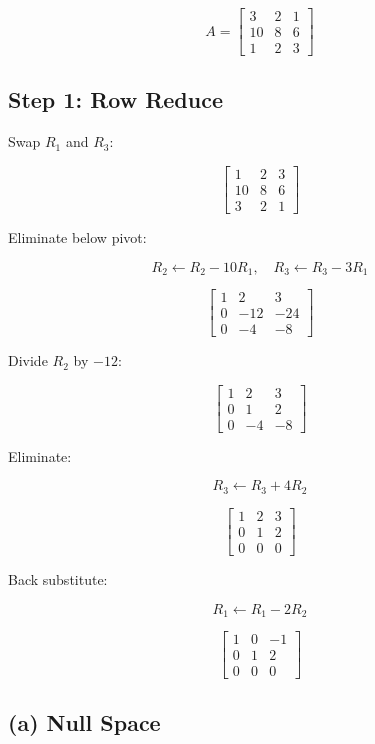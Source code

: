 \documentclass[11pt]{article}
\begin{document}
\[
A =
\begin{bmatrix}
3 & 2 & 1 \\
10 & 8 & 6 \\
1 & 2 & 3
\end{bmatrix}
\]

\subsection*{Step 1: Row Reduce}

Swap $R_1$ and $R_3$:

\[
\begin{bmatrix}
1 & 2 & 3 \\
10 & 8 & 6 \\
3 & 2 & 1
\end{bmatrix}
\]

Eliminate below pivot:

\[
R_2 \leftarrow R_2 - 10R_1,\quad
R_3 \leftarrow R_3 - 3R_1
\]

\[
\begin{bmatrix}
1 & 2 & 3 \\
0 & -12 & -24 \\
0 & -4 & -8
\end{bmatrix}
\]

Divide $R_2$ by $-12$:

\[
\begin{bmatrix}
1 & 2 & 3 \\
0 & 1 & 2 \\
0 & -4 & -8
\end{bmatrix}
\]

Eliminate:

\[
R_3 \leftarrow R_3 + 4R_2
\]

\[
\begin{bmatrix}
1 & 2 & 3 \\
0 & 1 & 2 \\
0 & 0 & 0
\end{bmatrix}
\]

Back substitute:

\[
R_1 \leftarrow R_1 - 2R_2
\]

\[
\begin{bmatrix}
1 & 0 & -1 \\
0 & 1 & 2 \\
0 & 0 & 0
\end{bmatrix}
\]

\subsection*{(a) Null Space}
\end{document}
